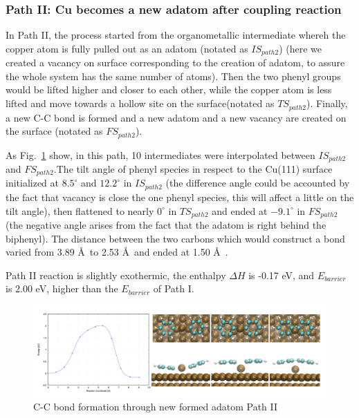 \documentclass[%
 reprint,
 amsmath,amssymb,
 aps,
prb,
]{revtex4-2}
\begin{document}
\subsubsection{Path II: Cu becomes a new adatom after coupling reaction}

In Path II, the process started from the organometallic intermediate whereh the copper atom is fully pulled out as an adatom (notated as $IS_{path2}$) (here we created a vacancy on surface corresponding to the creation of adatom, to assure the whole system has the same number of atoms). Then the two phenyl groups would be lifted higher and closer to each other, while the copper atom is less lifted and move towards a hollow site on the surface(notated as $TS_{path2}$). Finally, a new C-C bond is formed and a new adatom and a new vacancy are created on the surface (notated as $FS_{path2}$).

As Fig.~\ref{fig:bondformadatom} show, in this path, 10 intermediates were interpolated between $IS_{path2}$ and $FS_{path2}$.The tilt angle of phenyl species in respect to the Cu(111) surface initialized at $8.5^\circ$ and $12.2^\circ$ in $IS_{path2}$ (the difference angle could be accounted by the fact that vacancy is close the one phenyl species, this will affect a little on the tilt angle), then flattened to nearly $0^\circ$ in $TS_{path2}$ and ended at $-9.1^\circ$ in $FS_{path2}$ (the negative angle arises from the fact that the adatom is right behind the biphenyl). The distance between the two carbons which would construct a bond varied from 3.89 \AA\ to 2.53 \AA\ and ended at 1.50 \AA\ .

Path II reaction is slightly exothermic, the enthalpy $\Delta H$ is -0.17 eV, and $E_{barrier}$ is 2.00 eV, higher than the $E_{barrier}$ of Path I.

\begin{figure}[hbt]
\centering
\includegraphics[width=1.0\textwidth]{Fig/bondformadatom.png}
\caption{C-C bond formation through new formed adatom Path II}
\label{fig:bondformadatom}
\end{figure}
\end{document}
